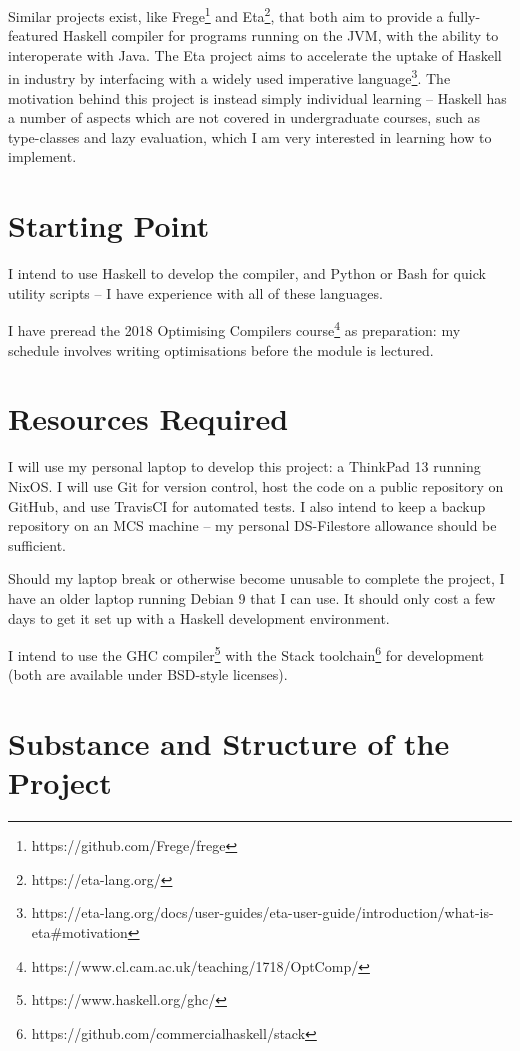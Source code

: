 \documentclass[12pt]{article}
\begin{document}
Similar projects exist, like Frege\footnote{https://github.com/Frege/frege} and Eta\footnote{https://eta-lang.org/},
that both aim to provide a fully-featured Haskell compiler for programs running on the JVM, with the ability to
interoperate with Java. The Eta project aims to accelerate the uptake of Haskell in industry by interfacing with a
widely used imperative
language\footnote{https://eta-lang.org/docs/user-guides/eta-user-guide/introduction/what-is-eta\#motivation}. The
motivation behind this project is instead simply individual learning -- Haskell has a number of aspects which are not
covered in undergraduate courses, such as type-classes and lazy evaluation, which I am very interested in learning how
to implement.


\section*{Starting Point}

I intend to use Haskell to develop the compiler, and Python or Bash for quick utility scripts -- I have experience with
all of these languages.
 
I have preread the 2018 Optimising Compilers course\footnote{https://www.cl.cam.ac.uk/teaching/1718/OptComp/} as
preparation: my schedule involves writing optimisations before the module is lectured.


\section*{Resources Required}

I will use my personal laptop to develop this project: a ThinkPad 13 running NixOS. I will use Git for version control,
host the code on a public repository on GitHub, and use TravisCI for automated tests. I also intend to keep a backup
repository on an MCS machine -- my personal DS-Filestore allowance should be sufficient.

Should my laptop break or otherwise become unusable to complete the project, I have an older laptop running Debian 9
that I can use. It should only cost a few days to get it set up with a Haskell development environment.

I intend to use the GHC compiler\footnote{https://www.haskell.org/ghc/} with the Stack
toolchain\footnote{https://github.com/commercialhaskell/stack} for development (both are available under BSD-style
licenses).


\section*{Substance and Structure of the Project}
\end{document}
